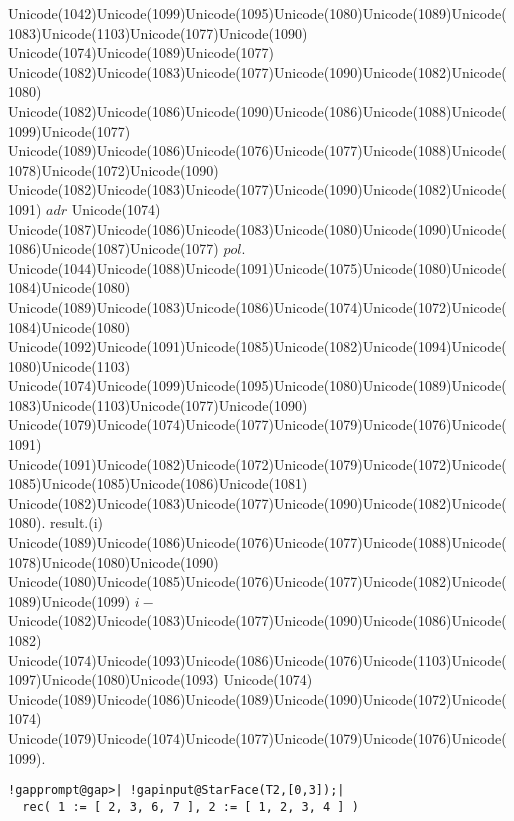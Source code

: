 \documentclass[a4paper,11pt]{report}
\begin{document}
{{{ Unicode(1042)Unicode(1099)Unicode(1095)Unicode(1080)Unicode(1089)Unicode(1083)Unicode(1103)Unicode(1077)Unicode(1090)
Unicode(1074)Unicode(1089)Unicode(1077)
Unicode(1082)Unicode(1083)Unicode(1077)Unicode(1090)Unicode(1082)Unicode(1080)
Unicode(1082)Unicode(1086)Unicode(1090)Unicode(1086)Unicode(1088)Unicode(1099)Unicode(1077)
Unicode(1089)Unicode(1086)Unicode(1076)Unicode(1077)Unicode(1088)Unicode(1078)Unicode(1072)Unicode(1090)
Unicode(1082)Unicode(1083)Unicode(1077)Unicode(1090)Unicode(1082)Unicode(1091) $adr$ Unicode(1074)
Unicode(1087)Unicode(1086)Unicode(1083)Unicode(1080)Unicode(1090)Unicode(1086)Unicode(1087)Unicode(1077) $pol$.
Unicode(1044)Unicode(1088)Unicode(1091)Unicode(1075)Unicode(1080)Unicode(1084)Unicode(1080)
Unicode(1089)Unicode(1083)Unicode(1086)Unicode(1074)Unicode(1072)Unicode(1084)Unicode(1080)
Unicode(1092)Unicode(1091)Unicode(1085)Unicode(1082)Unicode(1094)Unicode(1080)Unicode(1103)
Unicode(1074)Unicode(1099)Unicode(1095)Unicode(1080)Unicode(1089)Unicode(1083)Unicode(1103)Unicode(1077)Unicode(1090)
Unicode(1079)Unicode(1074)Unicode(1077)Unicode(1079)Unicode(1076)Unicode(1091)
Unicode(1091)Unicode(1082)Unicode(1072)Unicode(1079)Unicode(1072)Unicode(1085)Unicode(1085)Unicode(1086)Unicode(1081)
Unicode(1082)Unicode(1083)Unicode(1077)Unicode(1090)Unicode(1082)Unicode(1080).
result.(i)
Unicode(1089)Unicode(1086)Unicode(1076)Unicode(1077)Unicode(1088)Unicode(1078)Unicode(1080)Unicode(1090)
Unicode(1080)Unicode(1085)Unicode(1076)Unicode(1077)Unicode(1082)Unicode(1089)Unicode(1099) $i-$Unicode(1082)Unicode(1083)Unicode(1077)Unicode(1090)Unicode(1086)Unicode(1082)
Unicode(1074)Unicode(1093)Unicode(1086)Unicode(1076)Unicode(1103)Unicode(1097)Unicode(1080)Unicode(1093)
Unicode(1074)
Unicode(1089)Unicode(1086)Unicode(1089)Unicode(1090)Unicode(1072)Unicode(1074)
Unicode(1079)Unicode(1074)Unicode(1077)Unicode(1079)Unicode(1076)Unicode(1099). 
\begin{Verbatim}[commandchars=!@|,fontsize=\small,frame=single,label=Пример]
  !gapprompt@gap>| !gapinput@StarFace(T2,[0,3]);|
  rec( 1 := [ 2, 3, 6, 7 ], 2 := [ 1, 2, 3, 4 ] )
  						

\end{Verbatim}}}}
\end{document}
